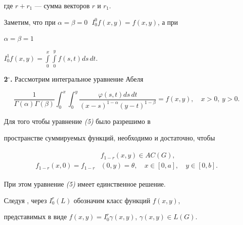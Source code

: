 где $r+r_1$ --- сумма векторов $r$ и $r_1$. 


 


Заметим, что при $\alpha=\beta=0\;$ $I^0_0f(x,y)=f(x,y)$, а при 


$\alpha=\beta=1\;$ 


$I^1_0f(x,y)=\int\limits^x_0\int\limits^y_0f(s,t)ds\,dt$. 


 


{\bf 2${}^\circ$.} Рассмотрим интегральное уравнение Абеля 


\begin{equation} 


\frac{1}{\Gamma(\alpha)\Gamma(\beta)} 


\int^x_0\int^y_0 


\frac{\varphi(s,t)ds\,dt}{(x-s)^{1-\alpha}(y-t)^{1-\beta}}=f(x,y), 


\quad x>0, \ y>0. 


\end{equation} 


 


\begin{lem} Для того чтобы уравнение {\em (5)} было разрешимо в 


пространстве суммируемых функций, необходимо и достаточно, чтобы 


\begin{align} 


\begin{split} 


&f_{1-r}(x,y)\in AC(G),\\ 


f_{1-r}(x,0)=f_{1-r}&(0,y)=\theta,\quad x\in[0,a], 


\quad y\in[0,b]. 


\end{split} 


\end{align} 


При этом уравнение {\em (5)} имеет единственное решение. 


\end{lem} 


 


Следуя \cite{Sam}, через $I^r_0(L)$ обозначим класс функций $f(x,y)$, 


представимых в виде $f(x,y)=I_0^r\gamma(x,y)$, $\gamma(x,y)\in L(G)$. 


